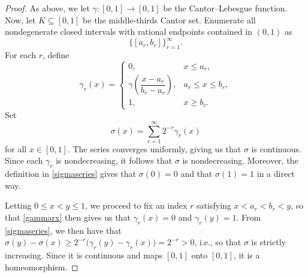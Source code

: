 \documentclass{publicadapt}
\begin{document}
\begin{proof}
 As above, we let \(\gamma:[0,1]\to[0,1]\) be the Cantor--Lebesgue function. Now, let
 $K \subseteq [0,1]$ be the middle-thirds Cantor set. Enumerate all nondegenerate
closed intervals with rational endpoints contained in \((0,1)\) as
\begin{equation}\label{countclosed}
 \{[a_r,b_r]\}_{r=1}^{\infty}.
\end{equation}
For each $r$, define 
\begin{equation}\label{gammarx}
\gamma_r(x) =
\begin{cases}
0, & x\le a_r,\\[4pt]
\gamma\!\left(\dfrac{x-a_r}{b_r-a_r}\right),
& a_r\le x\le b_r,\\[10pt]
1, & x\ge b_r.
\end{cases}
\end{equation}
Set
\begin{equation}\label{sigmaseries}
\sigma(x)=\sum_{r=1}^{\infty}2^{-r}\gamma_r(x) 
\end{equation}
 for all $x \in [0, 1]$. 
 The series converges uniformly, giving us that \(\sigma\) is continuous. Since each
\(\gamma_r\) is nondecreasing, it follows that \(\sigma\) is nondecreasing. Moreover, 
 the definition in \eqref{sigmaseries}
 gives that 
 $ \sigma(0)=0$ and that $\sigma(1)=1$ in a direct way. 
 
 Letting $0 \le x < y \le1$, we proceed to fix an index 
$r$ satisfying $
x<a_r<b_r<y$, so that \eqref{gammarx} then gives us that 
 $\gamma_r(x) = 0$ and $\gamma_r(y)=1$. From \eqref{sigmaseries}, 
 we then have that 
$
\sigma(y)-\sigma(x)
\ge
2^{-r}\bigl(\gamma_r(y)-\gamma_r(x)\bigr)
=
2^{-r}>0$, i.e., so that $\sigma$ is strictly increasing. Since it is continuous and maps
\([0,1]\) onto \([0,1]\), it is a homeomorphism. 


\end{proof}
\end{document}
